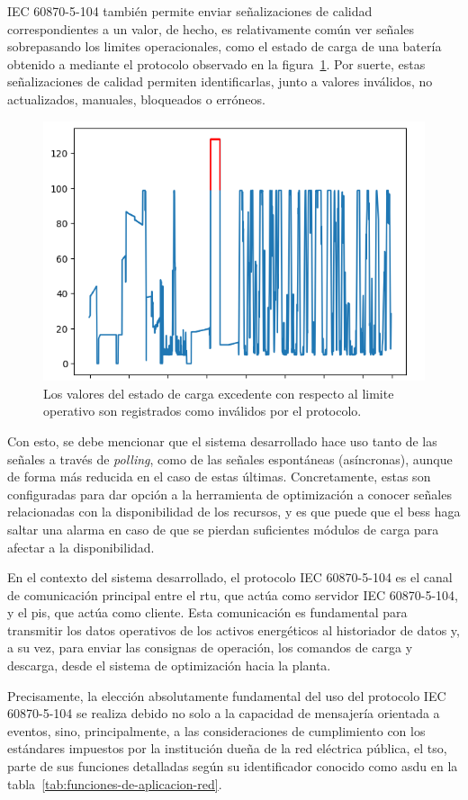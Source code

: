IEC 60870{-}5{-}104 también permite enviar señalizaciones de calidad correspondientes a un valor, de hecho, es relativamente común ver señales sobrepasando los limites operacionales, como el estado de carga de una batería obtenido a mediante el protocolo observado en la figura~\ref{fig:overflow-soc}. Por suerte, estas señalizaciones de calidad permiten identificarlas, junto a valores inválidos, no actualizados, manuales, bloqueados o erróneos.

\begin{figure}
  \centering
  \includegraphics[width=0.5\linewidth]{figures/overflow-soc.png}
  \caption[Estado de carga excedente.]{Los valores del estado de carga excedente con respecto al limite operativo son registrados como inválidos por el protocolo.}%
  \label{fig:overflow-soc}
\end{figure}

Con esto, se debe mencionar que el sistema desarrollado hace uso tanto de las señales a través de \textit{polling}, como de las señales espontáneas (asíncronas), aunque de forma más reducida en el caso de estas últimas. Concretamente, estas son configuradas para dar opción a la herramienta de optimización a conocer señales relacionadas con la disponibilidad de los recursos, y es que puede que el \gls{bess} haga saltar una alarma en caso de que se pierdan suficientes módulos de carga para afectar a la disponibilidad.

En el contexto del sistema desarrollado, el protocolo IEC 60870{-}5{-}104 es el canal de comunicación principal entre el \gls{rtu}, que actúa como servidor IEC 60870{-}5{-}104, y el \gls{pis}, que actúa como cliente. Esta comunicación es fundamental para transmitir los datos operativos de los activos energéticos al historiador de datos y, a su vez, para enviar las consignas de operación, los comandos de carga y descarga, desde el sistema de optimización hacia la planta.

Precisamente, la elección absolutamente fundamental del uso del protocolo IEC 60870{-}5{-}104 se realiza debido no solo a la capacidad de mensajería orientada a eventos, sino, principalmente, a las consideraciones de cumplimiento con los estándares impuestos por la institución dueña de la red eléctrica pública, el \gls{tso}, parte de sus funciones detalladas según su identificador conocido como \gls{asdu} en la tabla~\ref{tab:funciones-de-aplicacion-red}.


